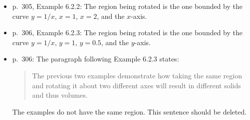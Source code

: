 \documentclass{amsart}
\begin{document}
\begin{itemize}
\begin{itemize}
\item p.\ 305, Example 6.2.2: The region being rotated is the one bounded by the curve $y=1/x$, $x=1$, $x=2$, and the $x$-axis.
\item p.\ 306, Example 6.2.3: The region being rotated is the one bounded by the curve $y=1/x$, $y=1$, $y=0.5$, and the $y$-axis.
\item p.\ 306: The paragraph following Example 6.2.3 states:
\begin{quote}
The previous two examples demonstrate how taking the same region and rotating it about two different axes will result in different solids and thus volumes.
\end{quote}
The examples do not have the same region.  This sentence should be deleted.
\end{itemize}
\end{itemize}
\end{document}
